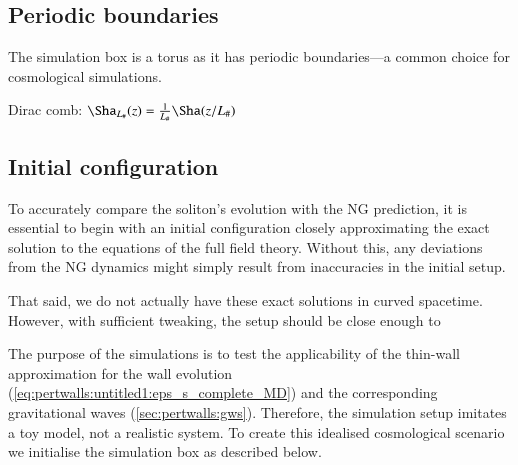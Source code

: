 \subsection{Periodic boundaries}
    The simulation box is a torus as it has periodic boundaries---a common choice for cosmological simulations. 

    \begin{bullets}
        \item Dirac comb: $\Sha_{L_\#}(z) = \frac{1}{L_{\#}} \Sha (z/L_\#)$
    \end{bullets}



\subsection{Initial configuration}

    To accurately compare the soliton's evolution with the NG prediction, it is essential to begin with an initial configuration closely approximating the exact solution to the equations of the full field theory. Without this, any deviations from the NG dynamics might simply result from inaccuracies in the initial setup.

    That said, we do not actually have these exact solutions in curved spacetime. However, with sufficient tweaking, the setup should be close enough to \blahblah

    The purpose of the simulations is to test the applicability of the thin-wall approximation for the wall evolution (\cref{eq:pertwalls:untitled1:eps_s_complete_MD}) and the corresponding gravitational waves (\cref{sec:pertwalls:gws}). Therefore, the simulation setup imitates a toy model, not a realistic system. To create this idealised cosmological scenario we initialise the simulation box as described below.


